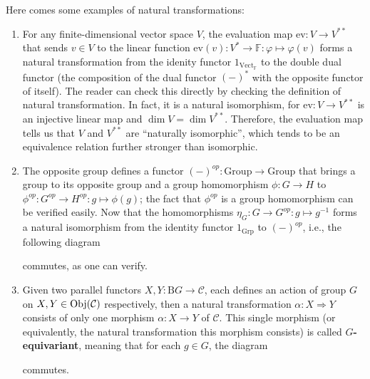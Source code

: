	\begin{example}
	Here comes some examples of natural transformations:
	\begin{enumerate}[label=(\roman*)]
		\item For any finite-dimensional vector space $V$, the evaluation map $\mathrm{ev}:V\to V^{**}$ that sends $v\in V$ to the linear function $\mathrm{ev}(v):V^*\to \mathbb{F}:\varphi\mapsto \varphi(v)$ forms a natural transformation from the idenity functor $1_{\mathrm{Vect}_\mathbb{F}}$ to the double dual functor (the composition of the dual functor $(-)^*$ with the opposite functor of itself). The reader can check this directly by checking the definition of natural transformation. In fact, it is a natural isomorphism, for $\mathrm{ev}:V\to V^{**}$ is an injective linear map and $\dim V=\dim V^{**}$. Therefore, the evaluation map tells us that $V$ and $V^{**}$ are ``naturally isomorphic'', which tends to be an equivalence relation further stronger than isomorphic.
		\item The opposite group defines a functor $(-)^{op}:\mathrm{Group}\to\mathrm{Group}$ that brings a group to its opposite group and a group homomorphism $\phi:G\to H$ to $\phi^{op}:G^{op}\to H^{op}:g\mapsto \phi(g)$; the fact that $\phi^{op}$ is a group homomorphism can be verified easily. Now that the homomorphisms $\eta_G:G\to G^{op}:g\mapsto g^{-1}$ forms a natural isomorphism from the identity functor $1_{\mathrm{Grp}}$ to $(-)^{op}$, i.e., the following diagram
		\begin{center}
		\end{center}
		commutes, as one can verify.
		\item Given two parallel functors $X,Y:\mathrm{B}G\to \mathcal{C}$, each defines an action of group $G$ on $X,Y\in\operatorname{Obj}(\mathcal{C})$ respectively, then a natural transformation $\alpha:X\Rightarrow Y$ consists of only one morphism $\alpha:X\to Y$ of $\mathcal{C}$. This single morphism (or equivalently, the natural transformation this morphism consists) is called $G$\textbf{-equivariant}, meaning that for each $g\in G$, the diagram
		\begin{center}
		\end{center}
		commutes.
	\end{enumerate}
	\end{example}
